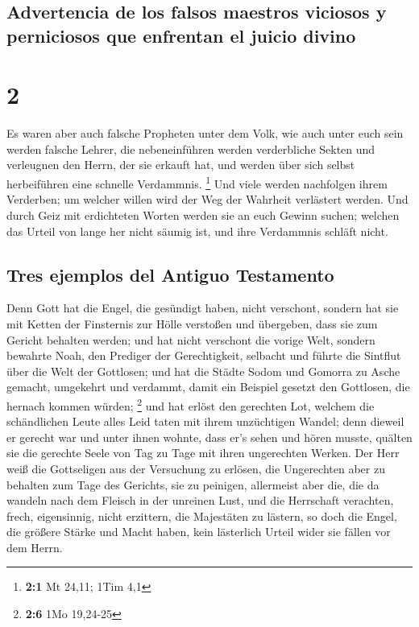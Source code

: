 \hypertarget{advertencia-de-los-falsos-maestros-viciosos-y-perniciosos-que-enfrentan-el-juicio-divino}{%
\subsection{Advertencia de los falsos maestros viciosos y perniciosos
que enfrentan el juicio
divino}\label{advertencia-de-los-falsos-maestros-viciosos-y-perniciosos-que-enfrentan-el-juicio-divino}}

\hypertarget{section-1}{%
\section{2}\label{section-1}}

 Es waren aber auch falsche Propheten unter dem Volk, wie
auch unter euch sein werden falsche Lehrer, die nebeneinführen werden
verderbliche Sekten und verleugnen den Herrn, der sie erkauft hat, und
werden über sich selbst herbeiführen eine schnelle Verdammnis.
\footnote{\textbf{2:1} Mt 24,11; 1Tim 4,1}  Und viele
werden nachfolgen ihrem Verderben; um welcher willen wird der Weg der
Wahrheit verlästert werden.  Und durch Geiz mit
erdichteten Worten werden sie an euch Gewinn suchen; welchen das Urteil
von lange her nicht säumig ist, und ihre Verdammnis schläft nicht.

\hypertarget{tres-ejemplos-del-antiguo-testamento}{%
\subsection{Tres ejemplos del Antiguo
Testamento}\label{tres-ejemplos-del-antiguo-testamento}}

 Denn Gott hat die Engel, die gesündigt haben, nicht
verschont, sondern hat sie mit Ketten der Finsternis zur Hölle verstoßen
und übergeben, dass sie zum Gericht behalten werden;  und
hat nicht verschont die vorige Welt, sondern bewahrte Noah, den Prediger
der Gerechtigkeit, selbacht und führte die Sintflut über die Welt der
Gottlosen;  und hat die Städte Sodom und Gomorra zu Asche
gemacht, umgekehrt und verdammt, damit ein Beispiel gesetzt den
Gottlosen, die hernach kommen würden; \footnote{\textbf{2:6} 1Mo
  19,24-25}  und hat erlöst den gerechten Lot, welchem die
schändlichen Leute alles Leid taten mit ihrem unzüchtigen Wandel;
 denn dieweil er gerecht war und unter ihnen wohnte, dass
er's sehen und hören musste, quälten sie die gerechte Seele von Tag zu
Tage mit ihren ungerechten Werken.  Der Herr weiß die
Gottseligen aus der Versuchung zu erlösen, die Ungerechten aber zu
behalten zum Tage des Gerichts, sie zu peinigen, 
allermeist aber die, die da wandeln nach dem Fleisch in der unreinen
Lust, und die Herrschaft verachten, frech, eigensinnig, nicht erzittern,
die Majestäten zu lästern,  so doch die Engel, die
größere Stärke und Macht haben, kein lästerlich Urteil wider sie fällen
vor dem Herrn.

